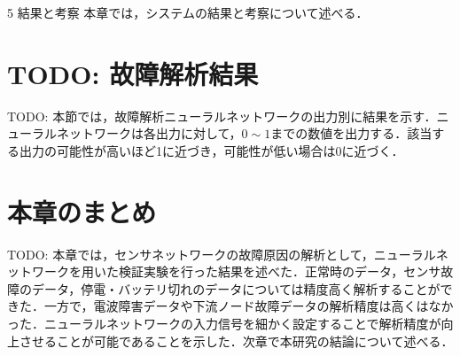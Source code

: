 \chapterhead
{5}
{結果と考察}
{本章では，システムの結果と考察について述べる．}

\newpage
\section{TODO: 故障解析結果}
TODO: 本節では，故障解析ニューラルネットワークの出力別に結果を示す．ニューラルネットワークは各出力に対して，$0 \sim 1$までの数値を出力する．該当する出力の可能性が高いほど1に近づき，可能性が低い場合は0に近づく．

\newpage

\section{本章のまとめ}
TODO: 本章では，センサネットワークの故障原因の解析として，ニューラルネットワークを用いた検証実験を行った結果を述べた．正常時のデータ，センサ故障のデータ，停電・バッテリ切れのデータについては精度高く解析することができた．一方で，電波障害データや下流ノード故障データの解析精度は高くはなかった．ニューラルネットワークの入力信号を細かく設定することで解析精度が向上させることが可能であることを示した．次章で本研究の結論について述べる．
\newpage
